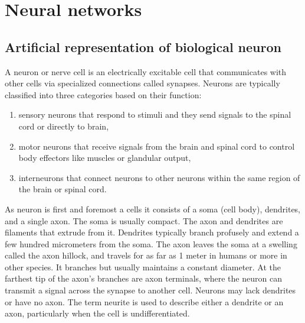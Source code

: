 \section{Neural networks}

\subsection{Artificial representation of biological neuron}
A neuron or nerve cell is an electrically excitable cell that communicates with other
cells via specialized connections called synapses. 
Neurons are typically classified into three categories based on their function:
\begin{enumerate}
	 \item sensory neurons that respond to stimuli and they send signals to the spinal cord or
		 directly to brain, 
	\item motor neurons that receive signals from the brain and spinal cord to control body
		effectors like muscles or glandular output,
	\item interneurons that connect neurons to other neurons within the same region of the brain 
		or spinal cord.
\end{enumerate}
As neuron is first and foremost a cells it consists of a soma (cell body), dendrites, and a 
single axon. The soma is usually compact. The axon and dendrites are filaments that extrude 
from it. Dendrites typically branch profusely and extend a few hundred micrometers from the soma.
The axon leaves the soma at a swelling called the axon hillock, and travels for as far as 1 meter 
in humans or more in other species. It branches but usually maintains a constant diameter.
At the farthest tip of the axon's branches are axon terminals, where the neuron can transmit
a signal across the synapse to another cell.
Neurons may lack dendrites or have no axon. The term neurite is used to describe either a dendrite
or an axon, particularly when the cell is undifferentiated.

